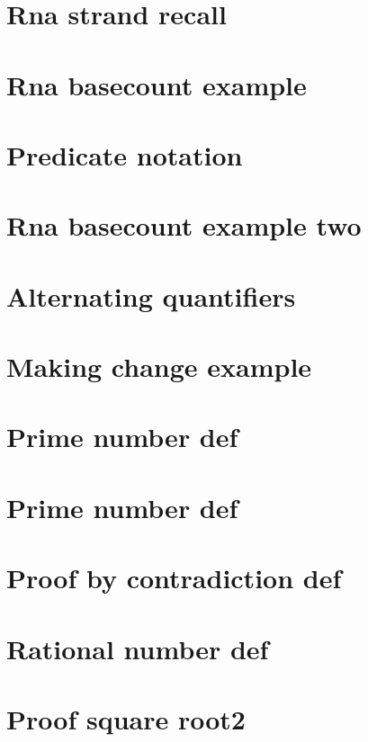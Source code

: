 \section*{Rna strand recall}

\vfill
\section*{Rna basecount example}

\vfill
\section*{Predicate notation}

\vfill
\section*{Rna basecount example two}

\vfill
\section*{Alternating quantifiers}

\vfill
\section*{Making change example}

\vfill
\section*{Prime number def}

\vfill
\section*{Prime number def}

\vfill
\section*{Proof by contradiction def}

\vfill
\section*{Rational number def}

\vfill
\section*{Proof square root2}

\vfill

